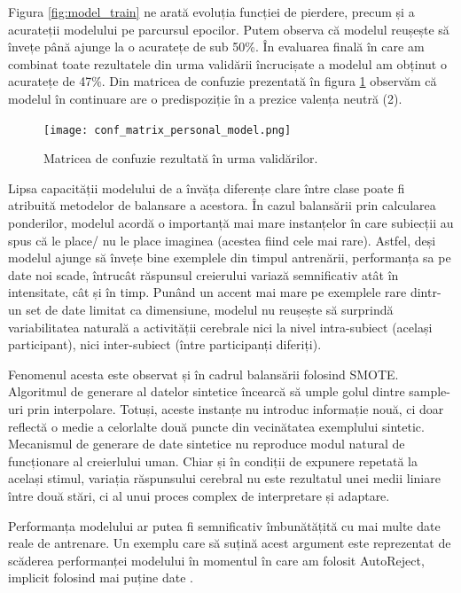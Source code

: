 Figura \ref{fig:model_train} ne arată evoluția funcției de pierdere, precum și a acurateții modelului pe parcursul epocilor. Putem observa că modelul reușește să învețe până ajunge la o acuratețe de sub 50\%. În evaluarea finală în care am combinat toate rezultatele din urma validării încrucișate a modelul am obținut o acuratețe de 47\%. Din matricea de confuzie prezentată în figura \ref{fig:conf_matrix} observăm că modelul în continuare are o predispoziție în a prezice valența neutră (2).

\begin{figure}[H]
    \centering
		\vspace{-1em}
    \texttt{[image: conf\_matrix\_personal\_model.png]}
    \caption{Matricea de confuzie rezultată în urma validărilor.}
		\vspace{-1em}
    \label{fig:conf_matrix}
\end{figure}

Lipsa capacității modelului de a învăța diferențe clare între clase poate fi atribuită metodelor de balansare a acestora. În cazul balansării prin calcularea ponderilor, modelul acordă o importanță mai mare instanțelor în care subiecții au spus că le place/ nu le place imaginea (acestea fiind cele mai rare). Astfel, deși modelul ajunge să învețe bine exemplele din timpul antrenării, performanța sa pe date noi scade, întrucât răspunsul creierului variază semnificativ atât în intensitate, cât și în timp. Punând un accent mai mare pe exemplele rare dintr-un set de date limitat ca dimensiune, modelul nu reușește să surprindă variabilitatea naturală a activității cerebrale nici la nivel intra-subiect (același participant), nici inter-subiect (între participanți diferiți).


Fenomenul acesta este observat și în cadrul balansării folosind SMOTE\cite{imblearn}. Algoritmul de generare al datelor sintetice încearcă să umple golul dintre sample-uri prin interpolare. Totuși, aceste instanțe nu introduc informație nouă, ci doar reflectă o medie a celorlalte două puncte din vecinătatea exemplului sintetic. Mecanismul de generare de date sintetice nu reproduce modul natural de funcționare al creierlului uman. Chiar și în condiții de expunere repetată la același stimul, variația răspunsului cerebral nu este rezultatul unei medii liniare între două stări, ci al unui proces complex de interpretare și adaptare.

Performanța modelului ar putea fi semnificativ îmbunătățită cu mai multe date reale de antrenare. Un exemplu care să suțină acest argument este reprezentat de scăderea performanței modelului în momentul în care am folosit AutoReject, implicit folosind mai puține date \cite{AutoReject}.